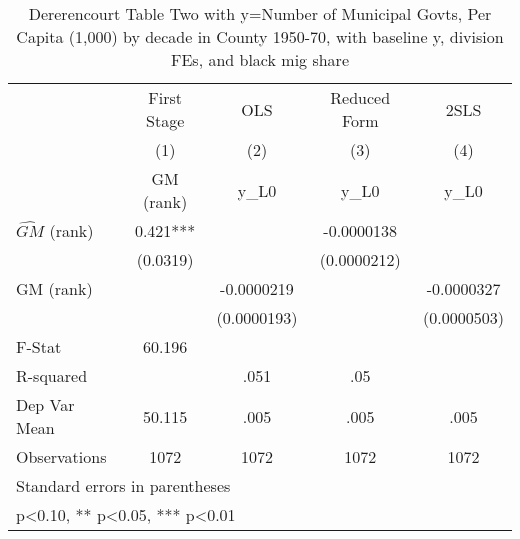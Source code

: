 \begin{table}[htbp]\centering
\def\sym#1{\ifmmode^{#1}\else\(^{#1}\)\fi}
\caption{Dererencourt Table Two with y=Number of Municipal Govts, Per Capita (1,000) by decade in County 1950-70, with baseline y, division FEs, and black mig share}
\begin{tabular}{l*{4}{c}}
\toprule
                    & First Stage   &         OLS   &Reduced Form   &        2SLS   \\
                    &\multicolumn{1}{c}{(1)}&\multicolumn{1}{c}{(2)}&\multicolumn{1}{c}{(3)}&\multicolumn{1}{c}{(4)}\\
                    &\multicolumn{1}{c}{GM  (rank)}&\multicolumn{1}{c}{y\_L0}&\multicolumn{1}{c}{y\_L0}&\multicolumn{1}{c}{y\_L0}\\
\midrule
$\hat{GM}$ (rank)   &       0.421***&               &  -0.0000138   &               \\
                    &    (0.0319)   &               & (0.0000212)   &               \\
\addlinespace
GM  (rank)          &               &  -0.0000219   &               &  -0.0000327   \\
                    &               & (0.0000193)   &               & (0.0000503)   \\
\midrule
F-Stat              &      60.196   &               &               &               \\
R-squared           &               &        .051   &         .05   &               \\
Dep Var Mean        &      50.115   &        .005   &        .005   &        .005   \\
Observations        &        1072   &        1072   &        1072   &        1072   \\
\bottomrule
\multicolumn{5}{l}{\footnotesize Standard errors in parentheses}\\
\multicolumn{5}{l}{\footnotesize * p<0.10, ** p<0.05, *** p<0.01}\\
\end{tabular}
\end{table}
